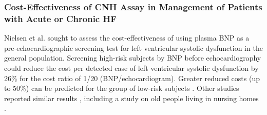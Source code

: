 \documentclass[14pt,a4paper,onecolumn]{extarticle}
\begin{document}


\subsubsection{ Cost-Effectiveness of CNH Assay in Management of Patients with Acute or Chronic HF}


Nielsen et al. \citep{bib392} sought to assess the cost-effectiveness of using plasma BNP as a pre-echocardiographic screening test for left ventricular systolic dysfunction in the general population. Screening high-risk subjects by BNP before echocardiography could reduce the cost per detected case of left ventricular systolic dysfunction by 26\% for the cost ratio of 1/20 (BNP/echocardiogram). Greater reduced costs (up to 50\%) can be predicted for the group of low-risk subjects \citep{bib392}. Other studies reported similar results \citep{bib393} \citep{bib3145}, including a study on old people living in nursing homes \citep{bib3147}.
\end{document}
